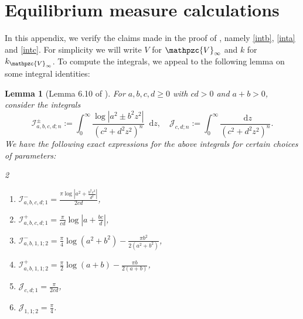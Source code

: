 \documentclass[reqno,11pt]{amsart}
\numberwithin{equation}{section}
\newtheorem{lemma}[proposition]{Lemma}
\theoremstyle{definition}
\newcommand*\diff{\mathop{}\!\mathrm{d}}
\begin{document}
\section{Equilibrium measure calculations} \label{sec.app}


In this appendix, we verify the claims made in the proof of , namely \eqref{intb}, \eqref{inta} and \eqref{intc}. For simplicity we will write $V$ for $\mathpzc{V}_\infty$ and $k$ for $k_{\mathpzc{V}_\infty}$. To compute the integrals, we appeal to the following lemma on some integral identities:
\begin{lemma}[Lemma 6.10 of \cite{das2022large}]\label{lm:integral}
    For $a,b,c,d\geq 0$ with $cd>0$ and $a+b>0$, consider the integrals 
    \begin{equation}
        \mathcal{I}^{\pm}_{a,b,c,d;n}:= \int_0^\infty \frac{\log|a^2\pm b^2z^2|}{(c^2+d^2z^2)^n}\diff z,\quad \mathcal{J}_{c,d;n}:= \int_0^\infty \frac{\diff z}{(c^2+d^2z^2)^n}.
    \end{equation}
    We have the following exact expressions for the above integrals for certain choices of parameters:
    \begin{multicols}{2}
    \begin{enumerate}
        \setlength\itemsep{0.8em}
        \item  $\displaystyle\mathcal{I}^{-}_{a,b,c,d;1}=\frac{\pi\log|a^2+\frac{b^2c^2}{d^2}|}{2cd}$,
        \item  $\mathcal{I}^{+}_{a,b,c,d;1}=\frac{\pi}{cd}\log|a+\frac{bc}{d}|$,
        \item $\displaystyle\mathcal{I}^{-}_{a,b,1,1;2}=\frac{\pi}{4}\log(a^2+b^2)-\frac{\pi b^2}{2(a^2+b^2)}$,
        \item $\displaystyle\mathcal{I}^{+}_{a,b,1,1;2}=\frac{\pi}{2}\log(a+b)-\frac{\pi b}{2(a+b)}$,
        \item $\displaystyle\mathcal{J}_{c,d;1}=\frac{\pi}{2cd}$,
        \item $\displaystyle\mathcal{J}_{1,1;2}=\frac{\pi}{4}$.
    \end{enumerate}
    \end{multicols}
\end{lemma}
\end{document}

